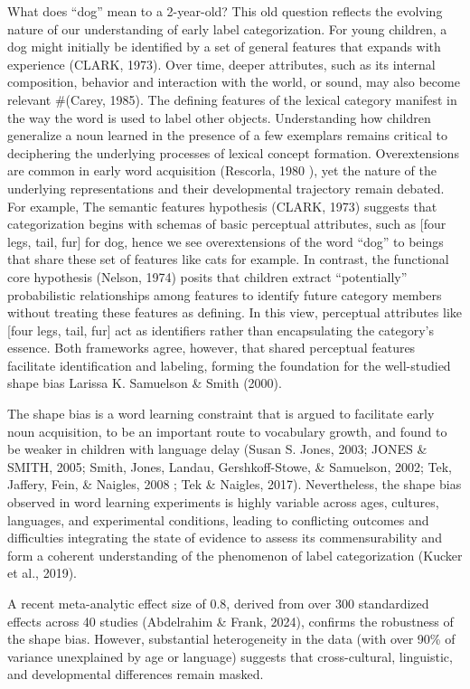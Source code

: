 \documentclass[10pt, letterpaper]{article}
\begin{document}
What does ``dog'' mean to a 2-year-old? This old question reflects the
evolving nature of our understanding of early label categorization. For
young children, a dog might initially be identified by a set of general
features that expands with experience (CLARK, 1973). Over time, deeper
attributes, such as its internal composition, behavior and interaction
with the world, or sound, may also become relevant \#(Carey, 1985). The
defining features of the lexical category manifest in the way the word
is used to label other objects. Understanding how children generalize a
noun learned in the presence of a few exemplars remains critical to
deciphering the underlying processes of lexical concept formation.
Overextensions are common in early word acquisition (Rescorla, 1980 ),
yet the nature of the underlying representations and their developmental
trajectory remain debated. For example, The semantic features hypothesis
(CLARK, 1973) suggests that categorization begins with schemas of basic
perceptual attributes, such as {[}four legs, tail, fur{]} for dog, hence
we see overextensions of the word ``dog'' to beings that share these set
of features like cats for example. In contrast, the functional core
hypothesis (Nelson, 1974) posits that children extract ``potentially''
probabilistic relationships among features to identify future category
members without treating these features as defining. In this view,
perceptual attributes like {[}four legs, tail, fur{]} act as identifiers
rather than encapsulating the category's essence. Both frameworks agree,
however, that shared perceptual features facilitate identification and
labeling, forming the foundation for the well-studied shape bias Larissa
K. Samuelson \& Smith (2000).

The shape bias is a word learning constraint that is argued to
facilitate early noun acquisition, to be an important route to
vocabulary growth, and found to be weaker in children with language
delay (Susan S. Jones, 2003; JONES \& SMITH, 2005; Smith, Jones, Landau,
Gershkoff-Stowe, \& Samuelson, 2002; Tek, Jaffery, Fein, \& Naigles,
2008 ; Tek \& Naigles, 2017). Nevertheless, the shape bias observed in
word learning experiments is highly variable across ages, cultures,
languages, and experimental conditions, leading to conflicting outcomes
and difficulties integrating the state of evidence to assess its
commensurability and form a coherent understanding of the phenomenon of
label categorization (Kucker et al., 2019).

A recent meta-analytic effect size of 0.8, derived from over 300
standardized effects across 40 studies (Abdelrahim \& Frank, 2024),
confirms the robustness of the shape bias. However, substantial
heterogeneity in the data (with over 90\% of variance unexplained by age
or language) suggests that cross-cultural, linguistic, and developmental
differences remain masked.
\end{document}
